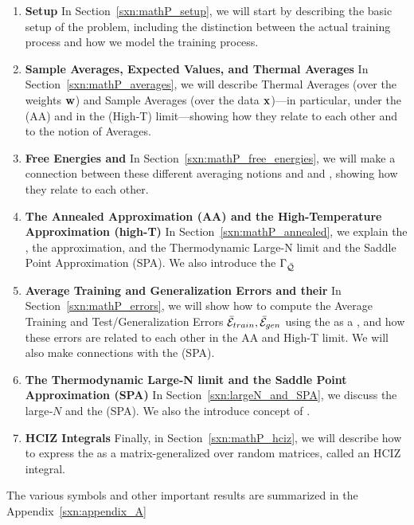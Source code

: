 \begin{enumerate}[label=4.2.\arabic*]
\item
  \textbf{Setup}
  In Section~\ref{sxn:mathP_setup}, 
we will start by describing the basic setup of the problem, including the distinction between the actual training process and how we model the training process.

 \item
  \textbf{Sample Averages, Expected Values, and Thermal Averages}
In Section~\ref{sxn:mathP_averages}, 
we will describe Thermal Averages (over the weights ${\mathbf{w}}$) and Sample Averages (over the data ${\mathbf{x}}$)---in particular, under the \AnnealedApproximation (AA) and in the \HighTemperature (High-T) limit---showing how they relate to each other and to the notion of \Replica Averages.
%
\item
  \textbf{Free Energies and \GeneratingFunctions} 
In Section~\ref{sxn:mathP_free_energies}, 
we will make a connection between these different averaging notions and \FreeEnergies and \GeneratingFunctions, showing how they relate to each other.
%

\item
  \textbf{The Annealed Approximation (AA) and the High-Temperature Approximation (high-T)}
  In Section~\ref{sxn:mathP_annealed}, we explain the \AnnealedApproximation, the \HighTemperature approximation,
  and the Thermodynamic Large-N limit and the Saddle Point Approximation (SPA).
  We also introduce the \Quality \GeneratingFunction $\Gamma_{\bar{\mathcal{Q}}}$
%
  \item
    \textbf{Average Training and Generalization Errors and their \GeneratingFunctions}
  In Section~\ref{sxn:mathP_errors}, we will show how to compute the Average Training and Test/Generalization Errors $\bar{\mathcal{E}}_{train}, \bar{\mathcal{E}}_{gen}$
using the \FreeEnergy as a \GeneratingFunction, and how these errors are related to each other in the AA and High-T limit. 
We will also make connections with the \SaddlePointApproximation (SPA).
%
\item 
  \textbf{The Thermodynamic Large-N limit and the Saddle Point Approximation (SPA)}
  In Section~\ref{sxn:largeN_and_SPA}, we discuss the large‐$N$ \ThermodynamicLimit and the \SaddlePointApproximation (SPA).
  We also the introduce concept of \SelfAveraging.
%
 \item
  \textbf{HCIZ Integrals}
Finally, in Section~\ref{sxn:mathP_hciz}, we will describe how to express the \FreeEnergy as a matrix-generalized \ThermalAverage over random matrices, called an HCIZ integral.
\end{enumerate}
The various symbols and other important results are summarized in the Appendix~\ref{sxn:appendix_A}


